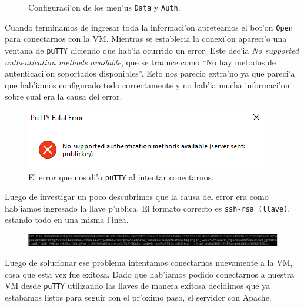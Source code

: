 \documentclass[11pt]{article}
\begin{document}
\begin{figure}[H]
\begin{subfigure}[b]{0.45\linewidth}
			\end{subfigure}
			\caption{Configuraci'on de los men'us \texttt{Data} y \texttt{Auth}.}
			\label{fig:putty_configs}
		\end{figure}
		
		Cuando terminamos de ingresar toda la informaci'on apreteamos el bot'on \texttt{Open} para conectarnos con la VM. Mientras se establecia la conexi'on apareci'o una ventana de \texttt{puTTY} diciendo que hab'ia ocurrido un error. Este dec'ia \textit{No supported authentication methods available}, que se traduce como ``No hay metodos de autenticaci'on soportados disponibles''. Esto nos parecio extra'no ya que pareci'a que hab'iamos configurado todo correctamente y no hab'ia mucha informaci'on sobre cual era la causa del error.
		
		\begin{figure}[H]
    			\centering
    			\includegraphics[scale=0.8]{Images/Connection/puTTY_error.PNG}
    			\caption{El error que nos di'o \texttt{puTTY} al intentar conectarnos.}
    			\label{fig:puTTY_error}
		\end{figure}
		
		Luego de investigar un poco descubrimos que la causa del error era como hab'iamos ingresado la llave p'ublica. El formato correcto es \texttt{ssh-rsa (llave)}, estando todo en una misma l'inea.
		
		\begin{figure}[H]
    			\centering
    			\includegraphics[scale=0.5]{Images/Connection/public_key_final.PNG}
    			\caption{}
    			\label{fig:public_key_final}
		\end{figure}
		
		Luego de solucionar ese problema intentamos conectarnos nuevamente a la VM, cosa que esta vez fue exitosa. Dado que hab'iamos podido conectarnos a nuestra VM desde \texttt{puTTY} utilizando las llaves de manera exitosa decidimos que ya estabamos listos para seguir con el pr'oximo paso, el servidor con Apache.
		
\end{document}
